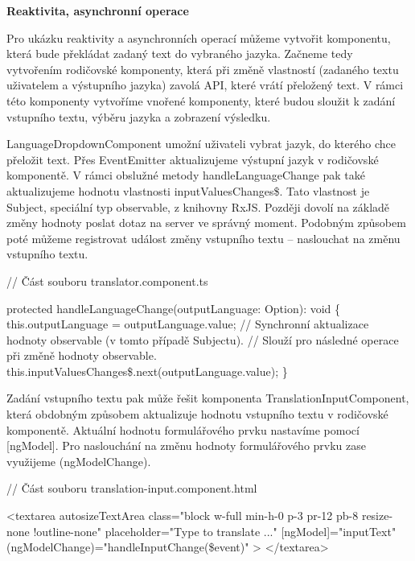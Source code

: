 \begin{flushleft}
  \textbf{Reaktivita, asynchronní operace}
\end{flushleft}

Pro ukázku reaktivity a asynchronních operací můžeme vytvořit komponentu, která bude překládat zadaný text do vybraného jazyka. 
Začneme tedy vytvořením rodičovské komponenty, která při změně vlastností (zadaného textu uživatelem a výstupního jazyka) zavolá API, které vrátí přeložený text. 
V rámci této komponenty vytvoříme vnořené komponenty, které budou sloužit k zadání vstupního textu, výběru jazyka a zobrazení výsledku. 

LanguageDropdownComponent umožní uživateli vybrat jazyk, do kterého chce přeložit text. 
Přes EventEmitter aktualizujeme výstupní jazyk v rodičovské komponentě. V rámci obslužné metody handleLanguageChange pak také aktualizujeme hodnotu vlastnosti inputValuesChanges\$.
Tato vlastnost je Subject, speciální typ observable, z knihovny RxJS. Později dovolí na základě změny hodnoty poslat dotaz na server ve správný moment. 
Podobným způsobem poté můžeme registrovat událost změny vstupního textu -- naslouchat na změnu vstupního textu.

\begin{prog}
// Část souboru translator.component.ts

protected handleLanguageChange(outputLanguage: Option): void \{
  this.outputLanguage = outputLanguage.value;
  // Synchronní aktualizace hodnoty observable (v tomto případě Subjectu).
  // Slouží pro následné operace při změně hodnoty observable.
  this.inputValuesChanges\$.next(outputLanguage.value);
\}
\end{prog}

Zadání vstupního textu pak může řešit komponenta TranslationInputComponent, která obdobným způsobem aktualizuje hodnotu vstupního textu v rodičovské komponentě. 
Aktuální hodnotu formulářového prvku nastavíme pomocí [ngModel]. Pro naslouchání na změnu hodnoty formulářového prvku zase využijeme (ngModelChange).

\begin{prog}
// Část souboru translation-input.component.html

<textarea
  autosizeTextArea
  class="block w-full min-h-0 p-3 pr-12 pb-8 resize-none !outline-none"
  placeholder="Type to translate ..."
  [ngModel]="inputText"
  (ngModelChange)="handleInputChange(\$event)"
>
</textarea>
\end{prog}

